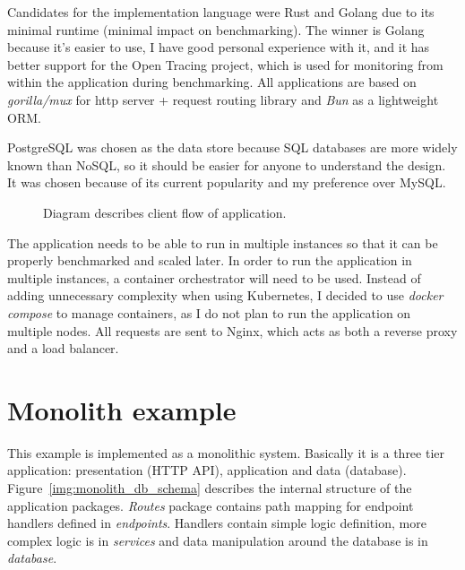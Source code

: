 Candidates for the implementation language were Rust and Golang due to its minimal runtime (minimal impact on benchmarking). The winner is Golang because it's easier to use, I have good personal experience with it, and it has better support for the Open Tracing project, which is used for monitoring from within the application during benchmarking. All applications are based on \textit{gorilla/mux} \cite{MUX} for http server + request routing library and \textit{Bun} \cite{BUN} as a lightweight ORM.

PostgreSQL was chosen as the data store because SQL databases are more widely known than NoSQL, so it should be easier for anyone to understand the design. It was chosen because of its current popularity and my preference over MySQL.
\begin{figure}
    \centering
    
    \caption{Diagram describes client flow of application. \label{img:app_activity_flow}}
\end{figure}

The application needs to be able to run in multiple instances so that it can be properly benchmarked and scaled later. In order to run the application in multiple instances, a container orchestrator will need to be used. Instead of adding unnecessary complexity when using Kubernetes, I decided to use \textit{docker compose} to manage containers, as I do not plan to run the application on multiple nodes. All requests are sent to Nginx, which acts as both a reverse proxy and a load balancer.


\section{Monolith example}
This example is implemented as a monolithic system. Basically it is a three tier application: presentation (HTTP API), application and data (database). Figure~\ref{img:monolith_db_schema} describes the internal structure of the application packages. \textit{Routes} package contains path mapping for endpoint handlers defined in \textit{endpoints}. Handlers contain simple logic definition, more complex logic is in \textit{services} and data manipulation around the database is in \textit{database}.

%     


